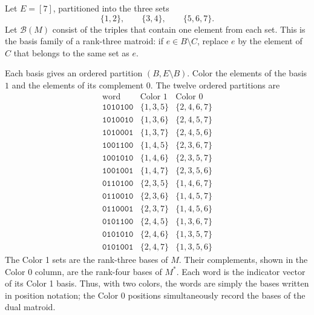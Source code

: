 \begin{example}
Let $E=[7]$, partitioned into the three sets
\[
 \{1,2\},\qquad \{3,4\},\qquad \{5,6,7\}.
\]
Let $\mathcal B(M)$ consist of the triples that contain one element from each
set. This is the basis family of a rank-three matroid: if
$e\in B\setminus C$, replace $e$ by the element of $C$ that belongs to the
same set as $e$.

Each basis gives an ordered partition $(B,E\setminus B)$. Color the elements
of the basis $1$ and the elements of its complement $0$. The twelve ordered
partitions are
\[
\begin{array}{c|c|c}
\text{word}&\text{Color }1&\text{Color }0\\ \hline
\mathtt{1010100}&\{1,3,5\}&\{2,4,6,7\}\\
\mathtt{1010010}&\{1,3,6\}&\{2,4,5,7\}\\
\mathtt{1010001}&\{1,3,7\}&\{2,4,5,6\}\\
\mathtt{1001100}&\{1,4,5\}&\{2,3,6,7\}\\
\mathtt{1001010}&\{1,4,6\}&\{2,3,5,7\}\\
\mathtt{1001001}&\{1,4,7\}&\{2,3,5,6\}\\
\mathtt{0110100}&\{2,3,5\}&\{1,4,6,7\}\\
\mathtt{0110010}&\{2,3,6\}&\{1,4,5,7\}\\
\mathtt{0110001}&\{2,3,7\}&\{1,4,5,6\}\\
\mathtt{0101100}&\{2,4,5\}&\{1,3,6,7\}\\
\mathtt{0101010}&\{2,4,6\}&\{1,3,5,7\}\\
\mathtt{0101001}&\{2,4,7\}&\{1,3,5,6\}
\end{array}
\]
The Color 1 sets are the rank-three bases of $M$. Their complements, shown in
the Color 0 column, are the rank-four bases of $M^*$. Each word is the
indicator vector of its Color 1 basis. Thus, with two colors, the words are
simply the bases written in position notation; the Color 0 positions
simultaneously record the bases of the dual matroid.


\end{example}
